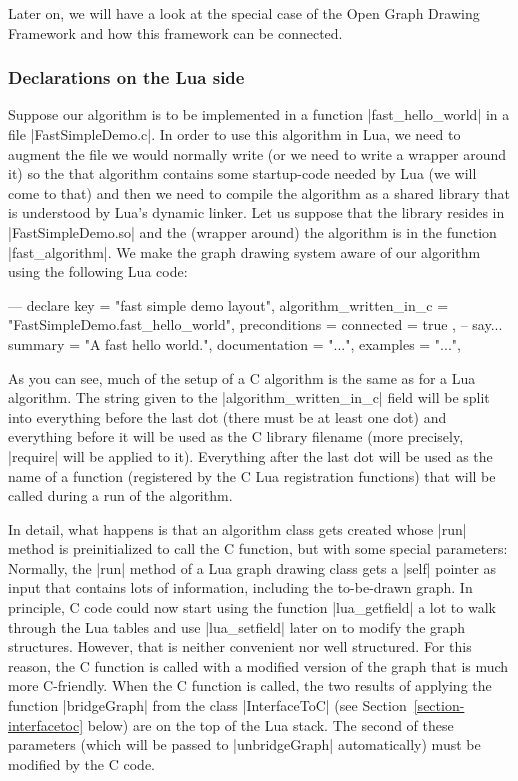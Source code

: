 Later on, we will have a look at the special case of the Open Graph
Drawing Framework and how this framework can be connected.


\subsubsection{Declarations on the Lua side}

Suppose our algorithm is to be implemented in a function
|fast_hello_world| in a file |FastSimpleDemo.c|. In order to use this
algorithm in Lua, we need to augment the file we would normally write
(or we need to write a wrapper around it) so the that algorithm
contains some startup-code needed by Lua (we will come to that) and
then we need to compile the algorithm as a shared library that is
understood by Lua's dynamic linker. Let us suppose that the library resides in
|FastSimpleDemo.so| and the (wrapper around) the algorithm is in the
function |fast_algorithm|. We make the graph drawing system aware of
our algorithm using the following Lua code: 

\begin{codeexample}
---
declare {
  key = "fast simple demo layout",
  algorithm_written_in_c = "FastSimpleDemo.fast_hello_world",
  preconditions = { connected = true }, -- say...
  summary = "A fast hello world.",
  documentation = "...",
  examples = "...",
}
\end{codeexample}

As you can see, much of the setup of a C algorithm is the same
as for a Lua algorithm. The string given to the
|algorithm_written_in_c| field will be split into everything before
the last dot (there must be at least one dot) and everything before
it will be used as the C library filename (more precisely, |require|
will be applied to it). Everything after the last dot will be used
as the name of a function (registered by the C Lua registration
functions) that will be called during a run of the algorithm.

In detail, what happens is that an algorithm class
gets created whose |run| method is preinitialized to call the
C function, but with some special parameters: Normally, the |run|
method of a Lua graph drawing class 
gets a |self| pointer as input that contains lots of information,
including the to-be-drawn graph. In principle, C code could now
start using the function |lua_getfield| a lot to walk through the
Lua tables and use |lua_setfield| later on to modify the graph
structures. However, that is neither convenient nor well
structured. For this reason, the C function is called with a
modified version of the graph that is much more C-friendly. When
the C function is called, the two results of applying the function
|bridgeGraph| from the class |InterfaceToC| (see
Section~\ref{section-interfacetoc} below) are on the top of the
Lua stack. The second of these parameters (which will be passed to
|unbridgeGraph| automatically) must be modified by the C code. 

